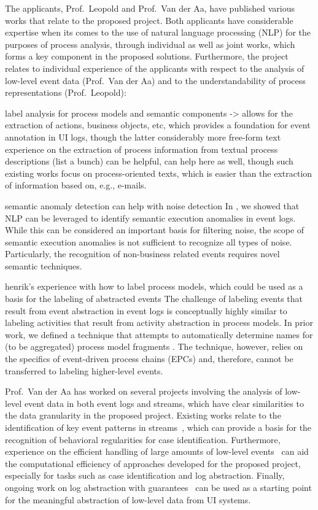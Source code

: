 The applicants, Prof.\ Leopold and Prof.\ Van der Aa, have published various works that relate to the proposed project. Both applicants have considerable expertise when its comes to the use of natural language processing (NLP) for the purposes of process analysis, through individual as well as joint works, which forms a key component in the proposed solutions.
Furthermore, the project relates to individual experience of the applicants with respect to the analysis of low-level event data (Prof.\ Van der Aa) and to the understandability of process representations (Prof.\ Leopold):


label analysis for process models  and semantic components -> allows for the extraction of actions, business objects, etc, which provides a foundation for event annotation in UI logs, though the latter considerably more free-form text
 experience on the extraction of process information from textual process descriptions (list a bunch) can be helpful, can help here as well, though such existing works focus on process-oriented texts, which is easier than the extraction of information based on, e.g., e-mails.

semantic anomaly detection can help with noise detection
In \cite{van2021natural}, we showed that NLP can be leveraged to identify semantic execution anomalies in event logs. While this can be considered an important basis for filtering noise, the scope of semantic execution anomalies is not sufficient to recognize all types of noise. Particularly, the recognition of non-business related events requires novel semantic techniques.   

henrik's experience with how to label process models, which could be used as a basis for the labeling of abstracted events
The challenge of labeling events that result from event abstraction in event logs is conceptually highly similar to labeling activities that result from activity abstraction in process models. In prior work, we defined a technique that attempts to automatically determine names for (to be aggregated) process model fragments \cite{leopold2014simplifying}. The technique, however, relies on the specifics of event-driven process chains (EPCs) and, therefore, cannot be transferred to labeling higher-level events. 


Prof.\ Van der Aa has worked on several projects involving the analysis of low-level event data in both event logs and streams, which have clear similarities to the data granularity in the proposed project.
Existing works relate to the identification of key event patterns in streams~\cite{cepchapter}, which can provide a basis for the recognition of behavioral regularities for case identification.
Furthermore, experience on the efficient handling of large amounts of low-level events~\cite{sigmodpaper} can aid the computational efficiency of approaches developed for the proposed project, especially for tasks such as case identification and log abstraction.
Finally, ongoing work on log abstraction with guarantees~\cite{icdesubmission} can be used as a starting point for the meaningful abstraction of low-level data from UI systems.

